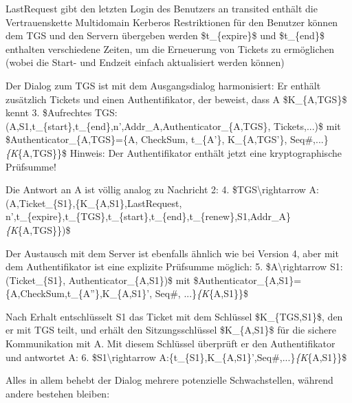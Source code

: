 \documentclass[a4paper]{article}
\begin{document}
\begin{multicols}{3}
\begin{itemize*}
            \begin{itemize*}
                  \item LastRequest gibt den letzten Login des Benutzers an transited enthält die Vertrauenskette Multidomain Kerberos Restriktionen für den Benutzer können dem TGS und den Servern übergeben werden \$t\_\{expire\}\$ und \$t\_\{end\}\$ enthalten verschiedene Zeiten, um die Erneuerung von Tickets zu ermöglichen (wobei die Start- und Endzeit einfach aktualisiert werden können)
            \end{itemize*}
            \item
            Der Dialog zum TGS ist mit dem Ausgangsdialog harmonisiert: Er enthält
            zusätzlich Tickets und einen Authentifikator, der beweist, dass A
            \$K\_\{A,TGS\}\$ kennt 3. \$Aufrechtes
            TGS:(A,S1,t\_\{start\},t\_\{end\},n',Addr\_A,Authenticator\_\{A,TGS\},
            Tickets,...)\$ mit \$Authenticator\_\{A,TGS\}=\{A, CheckSum,
            t\_\{A'\}, K\_\{A,TGS'\}, Seq\#,...\}\emph{\{K}\{A,TGS\}\}\$ Hinweis:
            Der Authentifikator enthält jetzt eine kryptographische Prüfsumme!
            \item
            Die Antwort an A ist völlig analog zu Nachricht 2: 4.
            \$TGS\textbackslash rightarrow
            A:(A,Ticket\_\{S1\},\{K\_\{A,S1\},LastRequest,
            n',t\_\{expire\},t\_\{TGS\},t\_\{start\},t\_\{end\},t\_\{renew\},S1,Addr\_A\}\emph{\{K}\{A,TGS\}\})\$
            \item
            Der Austausch mit dem Server ist ebenfalls ähnlich wie bei Version 4,
            aber mit dem Authentifikator ist eine explizite Prüfsumme möglich: 5.
            \$A\textbackslash rightarrow S1:(Ticket\_\{S1\},
            Authenticator\_\{A,S1\})\$ mit
            \$Authenticator\_\{A,S1\}=\{A,CheckSum,t\_\{A''\},K\_\{A,S1\}', Seq\#,
            ...\}\emph{\{K}\{A,S1\}\}\$
            \item
            Nach Erhalt entschlüsselt S1 das Ticket mit dem Schlüssel
            \$K\_\{TGS,S1\}\$, den er mit TGS teilt, und erhält den
            Sitzungsschlüssel \$K\_\{A,S1\}\$ für die sichere Kommunikation mit A.
            Mit diesem Schlüssel überprüft er den Authentifikator und antwortet A:
            6. \$S1\textbackslash rightarrow
            A:\{t\_\{S1\},K\_\{A,S1\}',Seq\#,...\}\emph{\{K}\{A,S1\}\}\$
            \item
            Alles in allem behebt der Dialog mehrere potenzielle Schwachstellen,
            während andere bestehen bleiben:


\end{itemize*}
\end{multicols}
\end{document}
